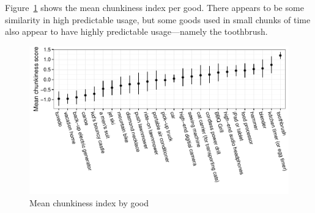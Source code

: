 \documentclass[11pt]{article}
\begin{document}
Figure~\ref{fig:granularity} shows the mean chunkiness index per good. 
There appears to be some similarity in high predictable usage, but some goods used in small chunks of time also appear to have highly predictable usage---namely the toothbrush. 

\begin{figure}
\centering 
\caption{Mean chunkiness index by good \label{fig:granularity}}
\begin{minipage}{0.90 \linewidth}
\includegraphics[width = \linewidth]{./plots/granularity.pdf} 
\end{minipage} 
\end{figure} 
\end{document}
